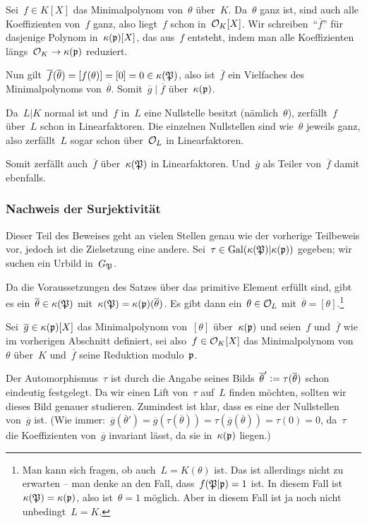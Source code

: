 \documentclass[8pt]{uebblatt}
\newcommand{\ov}[1]{\overline{#1}}
\begin{document}
Sei~$f \in K[X]$ das Minimalpolynom von~$\theta$ über~$K$. Da~$\theta$ ganz
ist, sind auch alle Koeffizienten von~$f$ ganz, also liegt~$f$ schon
in~$\mathcal{O}_K[X]$. Wir schreiben~"`$\ov f$"' für dasjenige Polynom
in~$\kappa(\mathfrak{p})[X]$, das aus~$f$ entsteht, indem man alle Koeffizienten
längs~$\mathcal{O}_K \to \kappa(\mathfrak{p})$ reduziert.

Nun gilt~$\ov f(\ov\theta) = [f(\theta)] = [0] = 0 \in \kappa(\PPP)$, also
ist~$\ov f$ ein Vielfaches des Minimalpolynoms von~$\ov\theta$. Somit~$\ov g
\mid \ov f$ über~$\kappa(\mathfrak{p})$.

Da~$L|K$ normal ist und~$f$ in~$L$ eine Nullstelle besitzt (nämlich~$\theta$),
zerfällt~$f$ über~$L$ schon in Linearfaktoren. Die einzelnen Nullstellen sind
wie~$\theta$ jeweils ganz, also zerfällt~$L$ sogar schon über~$\mathcal{O}_L$ in
Linearfaktoren.

Somit zerfällt auch~$\ov f$ über~$\kappa(\mathfrak{P})$ in Linearfaktoren. Und~$\ov g$
als Teiler von~$\ov f$ damit ebenfalls.


\subsubsection*{Nachweis der Surjektivität}

Dieser Teil des Beweises geht an vielen Stellen genau wie der vorherige
Teilbeweis vor, jedoch ist die Zielsetzung eine andere. Sei~$\tau \in
\mathrm{Gal}(\kappa(\mathfrak{P})|\kappa(\mathfrak{p}))$ gegeben; wir suchen ein Urbild
in~$G_{\mathfrak{P}}$.

Da die Voraussetzungen des Satzes über das primitive Element erfüllt sind, gibt
es ein~$\ov\theta \in \kappa(\PPP)$ mit~$\kappa(\PPP) = \kappa(\ppp)(\ov\theta)$.
Es gibt dann ein~$\theta \in \mathcal{O}_L$ mit~$\ov\theta = [\theta]$.\footnote{Man
kann sich fragen, ob auch~$L = K(\theta)$ ist. Das ist allerdings nicht zu
erwarten -- man denke an den Fall, dass~$f(\mathfrak{P}|\mathfrak{p}) = 1$ ist. In diesem Fall
ist~$\kappa(\mathfrak{P}) = \kappa(\mathfrak{p})$, also ist~$\theta = 1$ möglich. Aber in
diesem Fall ist ja noch nicht unbedingt~$L = K$.}

Sei~$\ov g \in \kappa(\ppp)[X]$ das Minimalpolynom von~$[\theta]$
über~$\kappa(\mathfrak{p})$ und seien~$f$ und~$\ov f$ wie im vorherigen Abschnitt
definiert, sei also~$f \in \mathcal{O}_K[X]$ das Minimalpolynom von~$\theta$ über~$K$
und~$\ov f$ seine Reduktion modulo~$\mathfrak{p}$.

Der Automorphismus~$\tau$ ist durch die Angabe seines Bilds~$\ov\theta' \defeq
\tau(\ov\theta)$ schon eindeutig festgelegt. Da wir einen Lift von~$\tau$
auf~$L$ finden möchten, sollten wir dieses Bild genauer studieren. Zumindest
ist klar, dass es eine der Nullstellen von~$\ov g$ ist. (Wie immer:~$\ov
g(\ov\theta') = \ov g(\tau(\ov\theta)) = \tau(\ov g(\ov\theta)) = \tau(0) =
0$, da~$\tau$ die Koeffizienten von~$\ov g$ invariant lässt, da sie
in~$\kappa(\mathfrak{p})$ liegen.)
\end{document}
